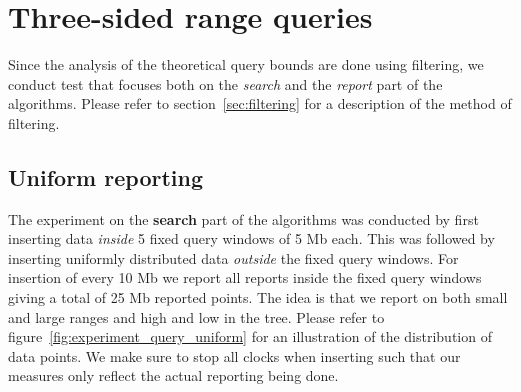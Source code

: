 \documentclass[twoside,11pt,openright]{report}
\begin{document}
\section{Three-sided range queries}
Since the analysis of the theoretical query bounds are done using filtering, we conduct test that focuses both on the \textit{search} and the \textit{report} part of the algorithms. Please refer to section~\ref{sec:filtering} for a description of the method of filtering.

\subsection{Uniform reporting}
The experiment on the \textbf{search} part of the algorithms was conducted by first inserting data \textit{inside} 5 fixed query windows of 5 Mb each. This was followed by inserting uniformly distributed data \textit{outside} the fixed query windows. For insertion of every 10 Mb we report all reports inside the fixed query windows giving a total of 25 Mb reported points. The idea is that we report on both small and large ranges and high and low in the tree. Please refer to figure~\ref{fig:experiment_query_uniform} for an illustration of the distribution of data points. We make sure to stop all clocks when inserting such that our measures only reflect the actual reporting being done.
\end{document}
